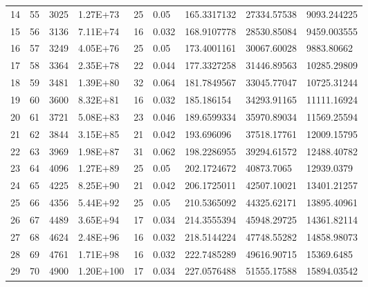 \documentclass{article}
\begin{document}
\begin{longtable}{@{}lllllllll@{}}
				14  & 55   & 3025                 & 1.27E+73    & 25  & 0.05  & 165.3317132 & 27334.57538                 & 9093.244225 \\
				15  & 56   & 3136                 & 7.11E+74    & 16  & 0.032 & 168.9107778 & 28530.85084                 & 9459.003555 \\
				16  & 57   & 3249                 & 4.05E+76    & 25  & 0.05  & 173.4001161 & 30067.60028                 & 9883.80662  \\
				17  & 58   & 3364                 & 2.35E+78    & 22  & 0.044 & 177.3327258 & 31446.89563                 & 10285.29809 \\
				18  & 59   & 3481                 & 1.39E+80    & 32  & 0.064 & 181.7849567 & 33045.77047                 & 10725.31244 \\
				19  & 60   & 3600                 & 8.32E+81    & 16  & 0.032 & 185.186154  & 34293.91165                 & 11111.16924 \\
				20  & 61   & 3721                 & 5.08E+83    & 23  & 0.046 & 189.6599334 & 35970.89034                 & 11569.25594 \\
				21  & 62   & 3844                 & 3.15E+85    & 21  & 0.042 & 193.696096  & 37518.17761                 & 12009.15795 \\
				22  & 63   & 3969                 & 1.98E+87    & 31  & 0.062 & 198.2286955 & 39294.61572                 & 12488.40782 \\
				23  & 64   & 4096                 & 1.27E+89    & 25  & 0.05  & 202.1724672 & 40873.7065                  & 12939.0379  \\
				24  & 65   & 4225                 & 8.25E+90    & 21  & 0.042 & 206.1725011 & 42507.10021                 & 13401.21257 \\
				25  & 66   & 4356                 & 5.44E+92    & 25  & 0.05  & 210.5365092 & 44325.62171                 & 13895.40961 \\
				26  & 67   & 4489                 & 3.65E+94    & 17  & 0.034 & 214.3555394 & 45948.29725                 & 14361.82114 \\
				27  & 68   & 4624                 & 2.48E+96    & 16  & 0.032 & 218.5144224 & 47748.55282                 & 14858.98073 \\
				28  & 69   & 4761                 & 1.71E+98    & 16  & 0.032 & 222.7485289 & 49616.90715                 & 15369.6485  \\
				29  & 70   & 4900                 & 1.20E+100   & 17  & 0.034 & 227.0576488 & 51555.17588                 & 15894.03542 \\

\end{longtable}
\end{document}
